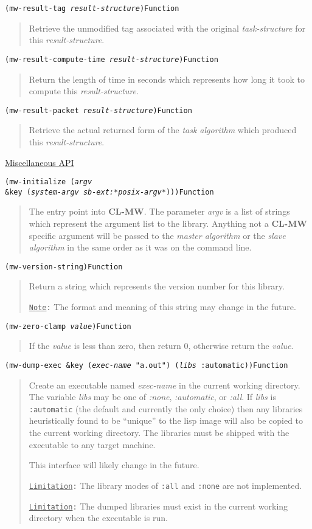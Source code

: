 \documentclass[titlepage,12pt]{book}
\newcommand{\xsmall}{\latexhtml{\small}{}}
\newcommand{\xnormalsize}{\latexhtml{\normalsize}{}}
\newcommand{\clmw}{\xsmall\textbf{CL-MW}\xnormalsize\xspace}
\newcommand{\sa}{\textit{slave algorithm}\xspace}
\newcommand{\ma}{\textit{master algorithm}\xspace}
\newcommand{\ta}{\textit{task algorithm}\xspace}
\newcommand{\Note}{\texttt{\underline{Note}:}\xspace}
\newcommand{\Limitation}{\texttt{\underline{Limitation}:}\xspace}
\newcommand{\apiheader}[1]{\begin{center}\underline{#1}\end{center}}
\newcommand{\apifunc}[2]{\noindent\xsmall\texttt{(#1)}\hspace*{\fill}\xnormalsize\texttt{#2}}
\newenvironment{apientry}[2]
	{\apifunc{#1}{#2}\begin{quotation}}
	{\end{quotation}}
\begin{document}
\begin{apientry}
{mw-result-tag \emph{result-structure}}
{Function}
Retrieve the unmodified tag associated with the original \emph{task-structure}
for this \emph{result-structure}.
\end{apientry}

\begin{apientry}
{mw-result-compute-time \emph{result-structure}}
{Function}
Return the length of time in seconds which represents how long it took to
compute this \emph{result-structure}.
\end{apientry}

\begin{apientry}
{mw-result-packet \emph{result-structure}}
{Function}
Retrieve the actual returned form of the \ta which produced this 
\emph{result-structure}.
\end{apientry}

\apiheader{Miscellaneous API}
\begin{apientry}
{mw-initialize (\emph{argv}\\
\indent \&key (\emph{system-argv} \emph{sb-ext:*posix-argv*}))}
{Function}
The entry point into \clmw. The parameter \emph{argv} is a list of
strings which represent the argument list to the library. Anything
not a \clmw specific argument will be passed to the \ma or the \sa
in the same order as it was on the command line.
\end{apientry}

\begin{apientry}
{mw-version-string}
{Function}
Return a string which represents the version number for this library.

\Note The format and meaning of this string may change in the future.
\end{apientry}

\begin{apientry}
{mw-zero-clamp \emph{value}}
{Function}
If the \emph{value} is less than zero, then return 0, otherwise return the
\emph{value}.
\end{apientry}

\begin{apientry}
{mw-dump-exec \&key (\emph{exec-name} "a.out") (\emph{libs} :automatic)}
{Function}
Create an executable named \emph{exec-name} in the current
working directory.  The variable \emph{libs} may be one of
\emph{:none}, \emph{:automatic}, or \emph{:all}. If \emph{libs} is
\texttt{:automatic} (the default and currently the only choice) then
any libraries heuristically found to be ``unique'' to the lisp image
will also be copied to the current working directory. The libraries
must be shipped with the executable to any target machine.

This interface will likely change in the future.

\Limitation The library modes of \texttt{:all} and \texttt{:none} are not
	implemented.

\Limitation The dumped libraries must exist in the current working directory
	when the executable is run.
\end{apientry}
\end{document}
